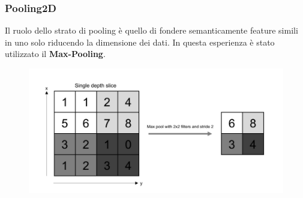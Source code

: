 \documentclass{beamer}
\begin{document}
\begin{frame}
	\frametitle{Pooling2D}
	Il ruolo dello strato di pooling è quello di fondere
 semanticamente feature simili in uno solo riducendo la dimensione dei dati.
 In questa esperienza è stato utilizzato il \textbf{Max-Pooling}.
	\begin{figure}
		\includegraphics[width=1\textwidth]{pooling-ex.PNG}
	\end{figure}
		
	
\end{frame}
\end{document}
